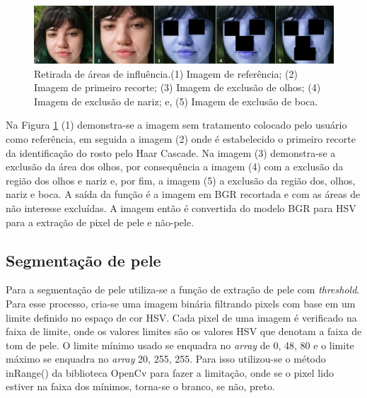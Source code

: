 \begin{figure}[h]
\centering
\caption{Retirada de áreas de influência.(1) Imagem de referência; (2) Imagem de primeiro recorte;  (3) Imagem de exclusão de olhos; (4) Imagem de exclusão de nariz; e, (5) Imagem de exclusão de boca.}
\includegraphics[scale=0.65]{Template_Latex_TCC-UNIFTEC/_lib/imagens/vittoriatestes2.png}

\label{fig: Etapas_de_teste_roi}
\end{figure}

Na Figura \ref{fig: Etapas_de_teste_roi} (1) demonstra-se a imagem sem tratamento colocado pelo usuário como referência, em seguida a imagem (2) onde é estabelecido o primeiro recorte da identificação do rosto pelo Haar Cascade. Na imagem (3) demonstra-se a exclusão da área dos olhos, por consequência a imagem (4) com a exclusão da região dos olhos e nariz e, por fim, a imagem (5) a exclusão da região dos, olhos, nariz e boca. 
A saída da função é a imagem  em BGR recortada e com as áreas de não interesse excluídas. A imagem então é convertida do modelo BGR para HSV para a extração de pixel de pele e não-pele.

\subsection{Segmentação de pele}

Para a segmentação de pele utiliza-se a função de extração de pele com \textit{threshold}. Para esse processo, cria-se uma imagem binária filtrando pixels com base em um limite definido no espaço de cor HSV. Cada pixel de uma imagem é verificado na faixa de limite, onde os valores limites são os valores HSV que denotam a faixa de tom de pele. O limite mínimo usado se enquadra no \textit{array} de 0, 48, 80 e o limite máximo se enquadra no \textit{array} 20, 255, 255. Para isso utilizou-se o método inRange() da biblioteca OpenCv para fazer a limitação, onde se o pixel lido estiver na faixa dos mínimos, torna-se o branco, se não, preto.

